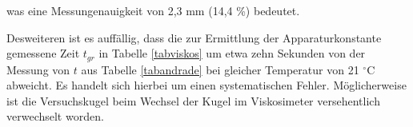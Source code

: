 was eine Messungenauigkeit von 2,3 mm (14,4 \%) bedeutet.

Desweiteren ist es auffällig, dass die zur Ermittlung der Apparaturkonstante gemessene Zeit $t_{gr}$ in Tabelle \ref{tabviskos} um etwa zehn 
Sekunden von der Messung von $t$ aus Tabelle \ref{tabandrade} bei gleicher Temperatur von 21 $^\circ$C abweicht. 
Es handelt sich hierbei um einen systematischen Fehler. Möglicherweise ist die Versuchskugel beim Wechsel der Kugel im Viskosimeter 
versehentlich verwechselt worden.






